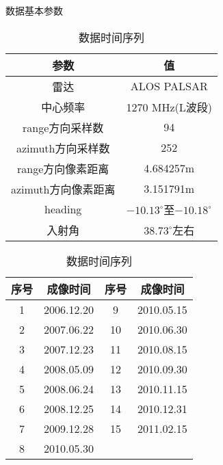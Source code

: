 \begin{table}
    \centering\small
    \begin{minipage}{0.49\textwidth}
        \centering
    \caption{数据基本参数}
    \label{tab:palsar}
    \begin{tabular}{@{}cc@{}}
    \toprule
    参数           & 值 \\ 
    \midrule
    雷达           & ALOS PALSAR  \\
    中心频率         & 1270 MHz(L波段) \\
    range方向采样数   & 94  \\
    azimuth方向采样数 & 252  \\
    range方向像素距离 & 4.684257m \\
    azimuth方向像素距离 & 3.151791m \\
    heading      & $-10.13^{\circ}$至$-10.18^{\circ}$ \\
    入射角          & $38.73^{\circ}$左右  \\
    \bottomrule
    \end{tabular}
    \end{minipage}
    \begin{minipage}{0.49\textwidth}
        \centering
        \caption{数据时间序列}
        \label{tab:timeseries}
        \begin{tabular}{@{}cccc@{}}
        \toprule
        序号 & 成像时间 & 序号 & 成像时间\\ 
        \midrule
        1 & 2006.12.20 & 9 & 2010.05.15 \\
        2 & 2007.06.22 & 10 & 2010.06.30 \\
        3 & 2007.12.23 & 11 & 2010.08.15 \\
        4 & 2008.05.09 & 12 & 2010.09.30 \\
        5 & 2008.06.24 & 13 & 2010.11.15 \\
        6 & 2008.12.25 & 14 & 2010.12.31 \\
        7 & 2009.12.28 & 15 & 2011.02.15 \\
        8 & 2010.05.30 & & \\
        \bottomrule
        \end{tabular}   
    \end{minipage}
\end{table}
